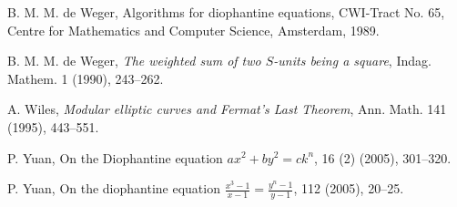 \begin{thebibliography}{}
B. M. M. de Weger,
\newblock Algorithms for diophantine equations,
\newblock CWI-Tract No. 65, Centre for Mathematics and Computer Science, Amsterdam, 1989.

B. M. M. de Weger,
\emph{The weighted sum of two $S$-units being a square},
Indag. Mathem. 1 (1990), 243--262.

A. Wiles,
\emph{Modular elliptic curves and Fermat's Last Theorem},
Ann. Math. 141 (1995), 443--551.

P. Yuan,
\newblock On the Diophantine equation $ax^2+by^2=ck^n$,
 16 (2) (2005), 301--320.

P. Yuan,
\newblock On the diophantine equation $\frac{x^3-1}{x-1}=\frac{y^n-1}{y-1}$,
 112 (2005), 20--25.

\end{thebibliography}


\endinput

Any text after an \endinput is ignored.
You could put scraps here or things in progress.

